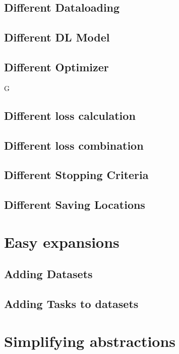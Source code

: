 \subsection{Different Dataloading}

\subsection{Different DL Model}

\subsection{Different Optimizer}G

\subsection{Different loss calculation}

\subsection{Different loss combination}

\subsection{Different Stopping Criteria}

\subsection{Different Saving Locations}

\section{Easy expansions}

\subsection{Adding Datasets}

\subsection{Adding Tasks to datasets}

\section{Simplifying abstractions}

